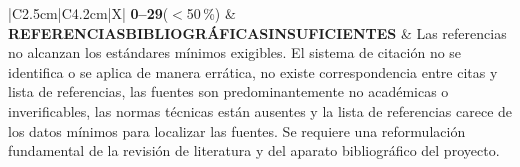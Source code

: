 \begin{table}[htbp]
\begin{tabularx}{\textwidth}{|C{2.5cm}|C{4.2cm}|X|}
\textbf{0--29}\newline($<$50\,\%) &
\textcolor{cins}{\textbf{REFERENCIAS\newline BIBLIOGRÁFICAS\newline INSUFICIENTES}} &
Las referencias no alcanzan los estándares mínimos exigibles. El sistema de citación no se identifica o se aplica de manera errática, no existe correspondencia entre citas y lista de referencias, las fuentes son predominantemente no académicas o inverificables, las normas técnicas están ausentes y la lista de referencias carece de los datos mínimos para localizar las fuentes. Se requiere una reformulación fundamental de la revisión de literatura y del aparato bibliográfico del proyecto. \\ \hline
\end{tabularx}
\normalsize
\end{table}

